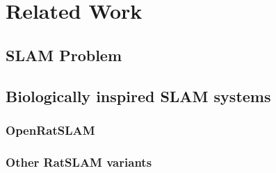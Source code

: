 \chapter{Related Work}\label{chapter:relatedWork}

\section{SLAM Problem}


\section{Biologically inspired SLAM systems}

\subsection{OpenRatSLAM}

\subsection{Other RatSLAM variants}